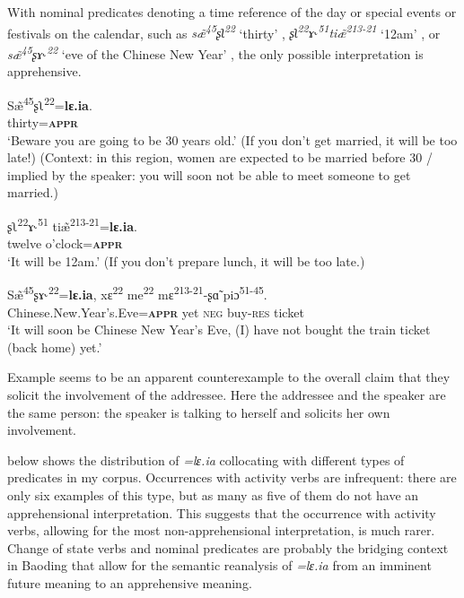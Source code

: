 \documentclass[output=paper,colorlinks,citecolor=brown, language=chinese]{langscibook}
\begin{document}
With nominal predicates denoting a time reference of the day or special events or festivals on the calendar, such as \textit{s\~æ\textsuperscript{45}ʂʅ\textsuperscript{22}} `thirty' , \textit{ʂʅ\textsuperscript{22}ɤ˞\textsuperscript{51}ti\~æ\textsuperscript{213-21}} `12am' , or \textit{s\~æ\textsuperscript{45}ʂɤ˞\textsuperscript{22}} `eve of the Chinese New Year' ,  the only possible interpretation is apprehensive. 

\ea\label{ex:Song20}
\gll S\~æ\textsuperscript{45}ʂʅ\textsuperscript{22}=\textbf{lɛ.ia}. \\
thirty=\textbf{\textsc{appr}}\\
\glt `Beware you are going to be 30 years old.' (If you don't get married, it will be too late!) (Context: in this region, women are expected to be married before 30 / implied by the speaker: you will soon not be able to meet someone to get married.)
\z

\ea\label{ex:Song21}
\gll ʂʅ\textsuperscript{22}ɤ˞\textsuperscript{51} ti\~æ\textsuperscript{213-21}=\textbf{lɛ.ia}. \\
twelve o'clock=\textsc{\textbf{appr}}\\
\glt `It will be 12am.' (If you don't prepare lunch, it will be too late.)
\z


\ea\label{ex:Song22}
\gll S\~æ\textsuperscript{45}ʂɤ˞\textsuperscript{22}=\textbf{lɛ.ia}, xɛ\textsuperscript{22} me\textsuperscript{22} mɛ\textsuperscript{213-21}-ʂɑ̃ piɔ\textsuperscript{51-45}. \\
Chinese.New.Year's.Eve=\textsc{\textbf{appr}} yet \textsc{neg} buy-\textsc{res} ticket \\
\glt `It will soon be Chinese New Year's Eve, (I) have not bought the train ticket (back home) yet.'
\z


\noindent Example  seems to be an apparent counterexample to the overall claim that they solicit the involvement of the addressee. Here the addressee and the speaker are the same person: the speaker is talking to herself and solicits her own involvement.

 below shows the distribution of \textit{=lɛ.ia} collocating with different types of predicates in my corpus. Occurrences with activity verbs are infrequent: there are only six examples of this type, but as many as five of them do not have an apprehensional interpretation. This suggests that the occurrence with activity verbs, allowing for the most non-apprehensional interpretation, is much rarer. Change of state verbs and nominal predicates are probably the bridging context in Baoding that allow for the semantic reanalysis of \textit{=lɛ.ia} from an imminent future meaning to an apprehensive meaning.
 
\end{document}
